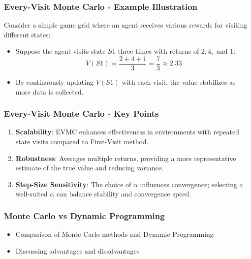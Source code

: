 \documentclass[aspectratio=169]{beamer}
\begin{document}
\begin{frame}[fragile]
    \frametitle{Every-Visit Monte Carlo - Example Illustration}
    Consider a simple game grid where an agent receives various rewards for visiting different states:
    
    \begin{itemize}
        \item Suppose the agent visits state \( S1 \) three times with returns of \( 2, 4, \) and \( 1 \):
        \begin{equation}
            V(S1) = \frac{2 + 4 + 1}{3} = \frac{7}{3} \approx 2.33
        \end{equation}
        \item By continuously updating \( V(S1) \) with each visit, the value stabilizes as more data is collected.
    \end{itemize}
\end{frame}

\begin{frame}[fragile]
    \frametitle{Every-Visit Monte Carlo - Key Points}
    \begin{enumerate}
        \item \textbf{Scalability}: EVMC enhances effectiveness in environments with repeated state visits compared to First-Visit method.
        
        \item \textbf{Robustness}: Averages multiple returns, providing a more representative estimate of the true value and reducing variance.
        
        \item \textbf{Step-Size Sensitivity}: The choice of \( \alpha \) influences convergence; selecting a well-suited \( \alpha \) can balance stability and convergence speed.
    \end{enumerate}
\end{frame}

\begin{frame}
    \frametitle{Monte Carlo vs Dynamic Programming}
    \begin{itemize}
        \item Comparison of Monte Carlo methods and Dynamic Programming
        \item Discussing advantages and disadvantages
    \end{itemize}
\end{frame}
\end{document}

